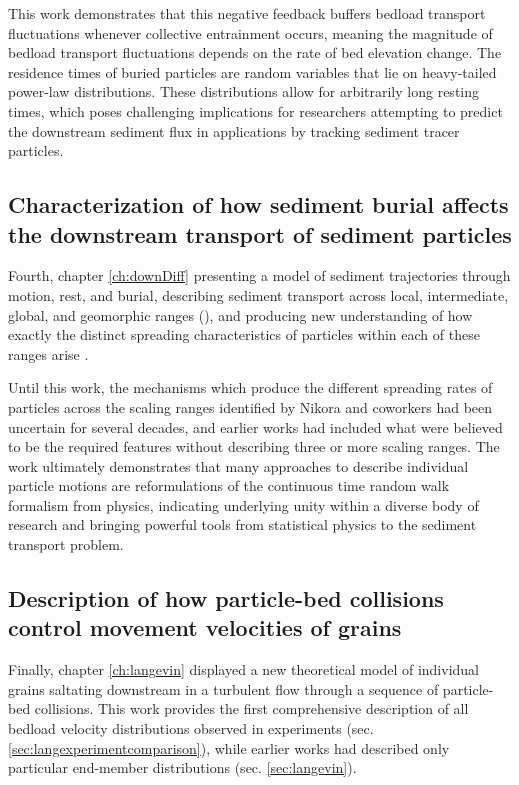This work demonstrates that this negative feedback buffers bedload transport fluctuations whenever collective entrainment occurs, meaning the magnitude of bedload transport fluctuations depends on the rate of bed elevation change. The residence times of buried particles are random variables that lie on heavy-tailed power-law distributions. These distributions allow for arbitrarily long resting times, which poses challenging implications for researchers attempting to predict the downstream sediment flux in applications by tracking sediment tracer particles. 

\subsection{Characterization of how sediment burial affects the downstream transport of sediment particles}

Fourth, chapter \ref{ch:downDiff} presenting a model of sediment trajectories through motion, rest, and burial, describing sediment transport across local, intermediate, global, and geomorphic ranges (), and producing new understanding of how exactly the distinct spreading characteristics of particles within each of these ranges arise \citep[e.g][]{Pretzlav2021}.

Until this work, the mechanisms which produce the different spreading rates of particles across the scaling ranges identified by Nikora and coworkers had been uncertain for several decades, and earlier works had included what were believed to be the required features without describing three or more scaling ranges. 
The work ultimately demonstrates that many approaches to describe individual particle motions are reformulations of the continuous time random walk formalism from physics, indicating underlying unity within a diverse body of research and bringing powerful tools from statistical physics to the sediment transport problem.

\subsection{Description of how particle-bed collisions control movement velocities of grains}

Finally, chapter \ref{ch:langevin} displayed a new theoretical model of individual grains saltating downstream in a turbulent flow through a sequence of particle-bed collisions.
This work provides the first comprehensive description of all bedload velocity distributions observed in experiments (sec. \ref{sec:langexperimentcomparison}), while earlier works had described only particular end-member distributions (sec. \ref{sec:langevin}).

